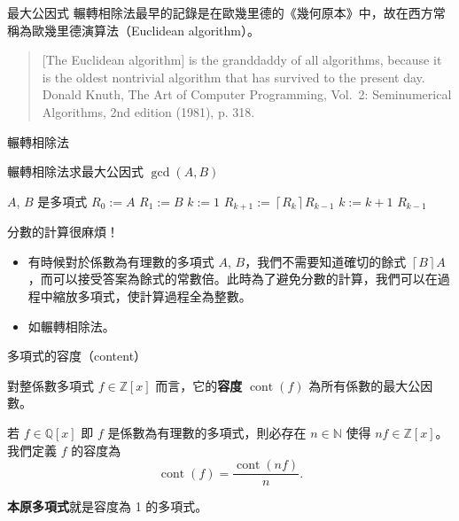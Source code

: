 \documentclass{beamer}
\newcommand{\N}{\mathbb N}
\newcommand{\Z}{\mathbb Z}
\newcommand{\Q}{\mathbb Q}
\newcommand{\cont}{\operatorname{cont}}
\theoremstyle{remark}
\begin{document}
\begin{CJK}{UTF8}{bsmi}
\begin{frame}{最大公因式}
  輾轉相除法最早的記錄是在歐幾里德的《幾何原本》中，故在西方常稱為歐幾里德演算法（Euclidean algorithm）。
  \begin{quote}
    [The Euclidean algorithm] is the granddaddy of all algorithms, because it is the oldest nontrivial algorithm that
    has survived to the present day.\\[1ex]
    \textup{Donald Knuth}, The Art of Computer Programming, Vol.\ 2: Seminumerical Algorithms, \textup{2nd edition (1981),
    p. 318.}
  \end{quote}
\end{frame}

\begin{frame}{輾轉相除法}
  \begin{algorithm}[H]
    \caption{輾轉相除法求最大公因式 $\gcd(A,B)$}
    \begin{algorithmic}[1]
      \REQUIRE $A$, $B$ 是多項式
      \STATE $R_0 := A$
      \STATE $R_1 := B$
      \STATE $k := 1$
	\STATE $R_{k+1} := \left\lceil R_k \right\rceil R_{k-1}$
	\STATE $k := k+1$
      \ENDWHILE
      \RETURN $R_{k-1}$ 
    \end{algorithmic}
  \end{algorithm}
\end{frame}

\begin{frame}{分數的計算很麻煩！}
  \begin{itemize}
    \item 有時候對於係數為有理數的多項式 $A$, $B$，我們不需要知道確切的餘式 $\left\lceil B \right\rceil
      A$，而可以接受答案為餘式的常數倍。此時為了避免分數的計算，我們可以在過程中縮放多項式，使計算過程全為整數。
    \item 如輾轉相除法。
  \end{itemize}
\end{frame}

\begin{frame}{多項式的容度（content）}
  \begin{definition}
    對整係數多項式 $f \in \Z[x]$ 而言，它的\textbf{容度} $\cont(f)$ 為所有係數的最大公因數。
  \end{definition}
  \begin{definition}
    若 $f \in \Q[x]$ 即 $f$ 是係數為有理數的多項式，則必存在 $n \in \N$ 使得 $nf \in \Z[x]$。我們定義 $f$ 的容度為
    \[\cont(f) = \frac{\cont(nf)}{n}.\]
  \end{definition}
  \begin{definition}
    \textbf{本原多項式}就是容度為 1 的多項式。
  \end{definition}
\end{frame}


\end{CJK}
\end{document}
